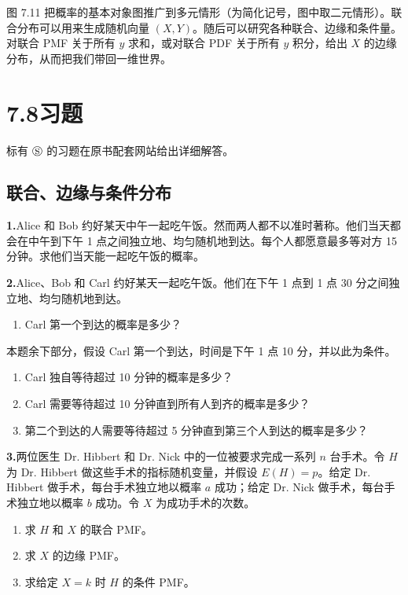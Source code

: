 \documentclass[UTF8,12pt,a4paper,fontset=fandol]{ctexart}
\begin{document}
图 7.11 把概率的基本对象图推广到多元情形（为简化记号，图中取二元情形）。联合分布可以用来生成随机向量 $(X,Y)$。随后可以研究各种联合、边缘和条件量。对联合 PMF 关于所有 $y$ 求和，或对联合 PDF 关于所有 $y$ 积分，给出 $X$ 的边缘分布，从而把我们带回一维世界。

\section*{7.8\quad 习题}

标有 $\circledS$ 的习题在原书配套网站给出详细解答。

\subsection*{联合、边缘与条件分布}

\noindent\textbf{1.}\quad Alice 和 Bob 约好某天中午一起吃午饭。然而两人都不以准时著称。他们当天都会在中午到下午 1 点之间独立地、均匀随机地到达。每个人都愿意最多等对方 15 分钟。求他们当天能一起吃午饭的概率。

\noindent\textbf{2.}\quad Alice、Bob 和 Carl 约好某天一起吃午饭。他们在下午 1 点到 1 点 30 分之间独立地、均匀随机地到达。
\begin{enumerate}
  \item[(a)] Carl 第一个到达的概率是多少？
\end{enumerate}
本题余下部分，假设 Carl 第一个到达，时间是下午 1 点 10 分，并以此为条件。
\begin{enumerate}
  \item[(b)] Carl 独自等待超过 10 分钟的概率是多少？
  \item[(c)] Carl 需要等待超过 10 分钟直到所有人到齐的概率是多少？
  \item[(d)] 第二个到达的人需要等待超过 5 分钟直到第三个人到达的概率是多少？
\end{enumerate}

\noindent\textbf{3.}\quad 两位医生 Dr. Hibbert 和 Dr. Nick 中的一位被要求完成一系列 $n$ 台手术。令 $H$ 为 Dr. Hibbert 做这些手术的指标随机变量，并假设 $E(H)=p$。给定 Dr. Hibbert 做手术，每台手术独立地以概率 $a$ 成功；给定 Dr. Nick 做手术，每台手术独立地以概率 $b$ 成功。令 $X$ 为成功手术的次数。
\begin{enumerate}
  \item[(a)] 求 $H$ 和 $X$ 的联合 PMF。
  \item[(b)] 求 $X$ 的边缘 PMF。
  \item[(c)] 求给定 $X=k$ 时 $H$ 的条件 PMF。
\end{enumerate}
\end{document}

